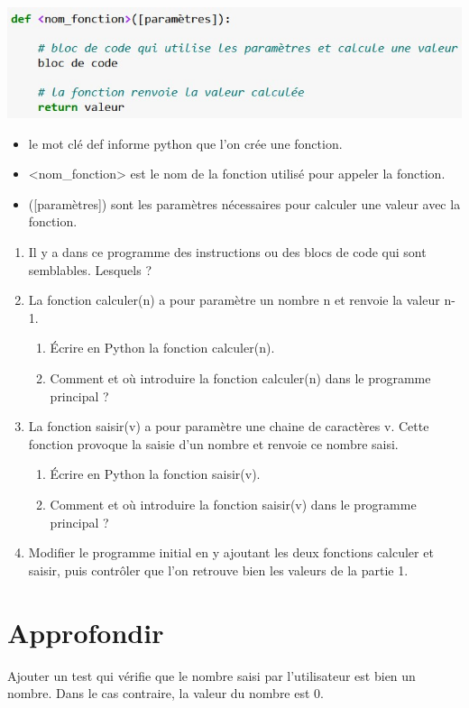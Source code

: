 \documentclass[12pt,a4paper]{article}
\begin{document}
\begin{center}
\includegraphics[scale=0.75]{img/activite_2.jpg}
\end{center}

\begin{itemize}[label=\textbullet]
\item le mot clé \textsf{def} informe python que l'on crée une fonction.
\item \textsf{<nom\_fonction>} est le nom de la fonction utilisé pour appeler la fonction.
\item \textsf{([paramètres])} sont les paramètres nécessaires pour calculer une valeur avec la fonction.
\end{itemize}

\begin{enumerate}
\item Il y a dans ce programme des instructions ou des blocs de code qui sont semblables. Lesquels ?

\item La fonction \textsf{calculer(n)} a pour paramètre un nombre \textsf{n} et renvoie la valeur \textsf{n-1}.

\begin{enumerate}
\item Écrire en Python la fonction \textsf{calculer(n)}.
\item Comment et où introduire la fonction \textsf{calculer(n)} dans le programme principal ?
\end{enumerate}

\item La fonction \textsf{saisir(v)} a pour paramètre une chaine de caractères \textsf{v}. Cette fonction provoque la saisie d'un nombre et renvoie ce nombre saisi.

\begin{enumerate}
\item Écrire en Python la fonction \textsf{saisir(v)}.
\item Comment et où introduire la fonction \textsf{saisir(v)} dans le programme principal ?
\end{enumerate}


\item Modifier le programme initial en y ajoutant les deux fonctions \textsf{calculer} et \textsf{saisir}, puis contrôler que l'on retrouve bien les valeurs de la partie 1.

\end{enumerate}

\section*{Approfondir}

Ajouter un test qui vérifie que le nombre saisi par l'utilisateur est bien un nombre. Dans le cas contraire, la valeur du nombre est $0$.
\end{document}
